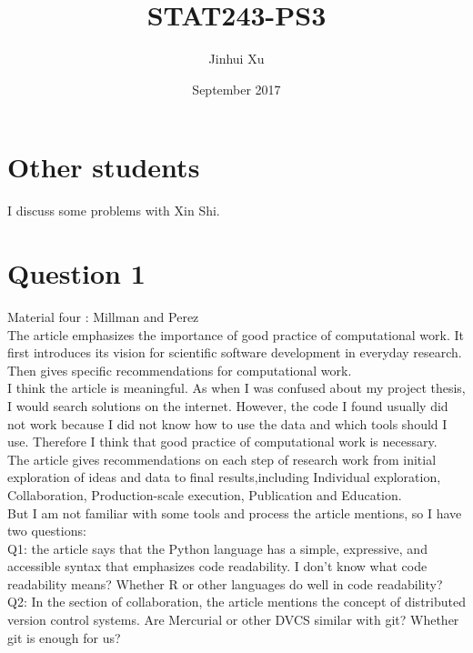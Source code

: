 \documentclass{article}\usepackage[]{graphicx}\usepackage[]{color}
\begin{document}
 
\title{STAT243-PS3}
\author{Jinhui Xu}
\date{September 2017}

\maketitle

\section{Other students}
I discuss some problems with Xin Shi.  

\section{Question 1}
Material four : Millman and Perez\\

The article emphasizes the importance of good practice of computational work. It first introduces its vision for scientific software development in everyday research. Then gives specific recommendations for computational work.\\

I think the article is meaningful. As when I was confused about my project thesis, I would search solutions on the internet. However, the code I found usually did not work because I did not know how to use the data and which tools should I use. Therefore I think that good practice of computational work is necessary.\\

The article gives recommendations on each step of research work from initial exploration of ideas and data to final results,including Individual exploration,  Collaboration, Production-scale execution, Publication and Education.\\


But I am not familiar with some tools and process the article mentions, so I have two questions:\\

Q1: the article says that the Python language has a simple, expressive, and accessible syntax that emphasizes code readability. I don’t know what code readability means? Whether R or other languages do well in code readability?\\

Q2: In the section of collaboration, the article mentions the concept of distributed version control systems. Are Mercurial or other DVCS similar with git? Whether git is enough for us?
\end{document}
